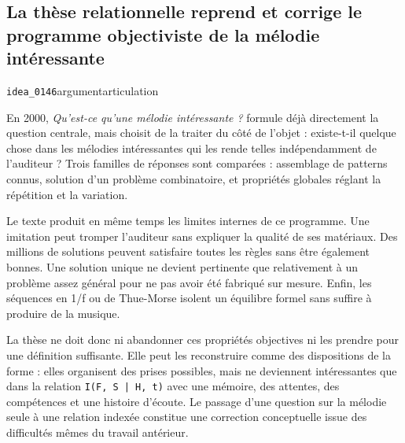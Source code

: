 \documentclass[10pt,a4paper]{article}
\begin{document}
\subsection{La thèse relationnelle reprend et corrige le programme objectiviste de la mélodie intéressante}
{\small\color{metadata} \texttt{idea\_0146}\quad\textbullet\quad argument\quad\textbullet\quad articulation\par}

En 2000, \emph{Qu'est-ce qu'une mélodie intéressante ?} formule déjà directement la question centrale, mais choisit de la traiter du côté de l'objet : existe-t-il quelque chose dans les mélodies intéressantes qui les rende telles indépendamment de l'auditeur ? Trois familles de réponses sont comparées : assemblage de patterns connus, solution d'un problème combinatoire, et propriétés globales réglant la répétition et la variation.

Le texte produit en même temps les limites internes de ce programme. Une imitation peut tromper l'auditeur sans expliquer la qualité de ses matériaux. Des millions de solutions peuvent satisfaire toutes les règles sans être également bonnes. Une solution unique ne devient pertinente que relativement à un problème assez général pour ne pas avoir été fabriqué sur mesure. Enfin, les séquences en 1/f ou de Thue-Morse isolent un équilibre formel sans suffire à produire de la musique.

La thèse ne doit donc ni abandonner ces propriétés objectives ni les prendre pour une définition suffisante. Elle peut les reconstruire comme des dispositions de la forme : elles organisent des prises possibles, mais ne deviennent intéressantes que dans la relation \texttt{I(F, S | H, t)} avec une mémoire, des attentes, des compétences et une histoire d'écoute. Le passage d'une question sur la mélodie seule à une relation indexée constitue une correction conceptuelle issue des difficultés mêmes du travail antérieur.
\end{document}
